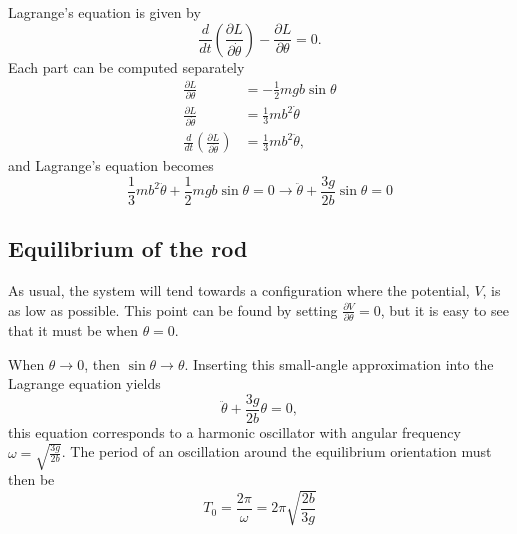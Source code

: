 \documentclass[11pt]{amsart}
\begin{document}
Lagrange's equation is given by
\begin{equation}
\label{eq:lagreqn}
\frac{d }{dt}\left(\frac{\partial L}{\partial \dot{\theta}} \right) - \frac{\partial L}{\partial \theta} = 0.
\end{equation}
Each part can be computed separately
\begin{align*}
\frac{\partial L}{\partial \theta} &= -\frac{1}{2} mgb \sin \theta \\
\frac{\partial L}{\partial \dot{\theta}} &= \frac{1}{3}mb^2\dot{\theta} \\
\frac{d }{dt}\left(\frac{\partial L}{\partial \dot{\theta}} \right) &= \frac{1}{3}mb^2 \ddot{\theta},
\end{align*}
and Lagrange's equation becomes
\begin{equation}
\frac{1}{3}mb^2\ddot{\theta} + \frac{1}{2}mgb \sin \theta = 0 \rightarrow 
\ddot{\theta} + \frac{3g}{2b}\sin \theta = 0
\end{equation}

\subsection{Equilibrium of the rod}
As usual, the system will tend towards a configuration where the potential, $V$, is as low as possible.  This point can be found by setting $\frac{\partial V}{\partial \theta} = 0$, but it is easy to see that it must be when $\theta = 0$.

When $\theta \to 0$, then $\sin \theta \to \theta$. Inserting this small-angle approximation into the Lagrange equation yields
\begin{equation}
\label{eq:lagapprox}
\ddot{\theta} + \frac{3g}{2b}\theta = 0,
\end{equation}
this equation corresponds to a harmonic oscillator with angular frequency $\omega = \sqrt{\frac{3g}{2b}}$. The period of an oscillation around the equilibrium orientation must then be
\begin{equation}
\label{eq:HOperiod}
T_0 = \frac{2\pi}{\omega} = 2\pi \sqrt{\frac{2b}{3g}}
\end{equation}
\end{document}
